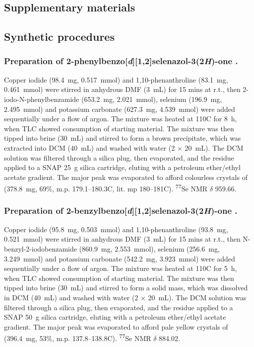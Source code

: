 \begin{refsection}
\section{Supplementary materials}

\subsection{Synthetic procedures}

\subsubsection[Preparation of \refcmpd{ebs}.]{Preparation of 2-phenylbenzo[\emph{d}][1,2]selenazol-3(2\emph{H})-one .}

Copper iodide (98.4~mg, 0.517~mmol) and 1,10-phenanthroline (83.1~mg, 0.461~mmol) were stirred in anhydrous DMF (3~mL) for 15 mins at r.t., then 2-iodo-N-phenylbenz\-amide (653.2~mg, 2.021~mmol), selenium (196.9~mg, 2.495~mmol) and potassium carbonate (627.3~mg, 4.539~mmol) were added sequentially under a flow of argon.
The mixture was heated at 110\degree C for 8~h, when TLC showed consumption of starting material.
The mixture was then tipped into brine (30~mL) and stirred to form a brown precipitate, which was extracted into DCM (40~mL) and washed with water (2 $\times$ 20~mL).
The DCM solution was filtered through a silica plug, then evaporated, and the residue applied to a SNAP 25~g silica cartridge, eluting with a petroleum ether/ethyl acetate gradient.
The major peak was evaporated to afford colourless crystals of  (378.8~mg, 69\%, m.p. 179.1--180.3\degree C, lit. mp 180--181\degree C). \textsuperscript{77}Se NMR $\delta$ 959.66.

\subsubsection[Preparation of \refcmpd{ebs.bn}.]{Preparation of 2-benzylbenzo[\emph{d}][1,2]selenazol-3(2\emph{H})-one .}

Copper iodide (95.8~mg, 0.503~mmol) and 1,10-phenanthroline (93.8~mg, 0.521~mmol) were stirred in anhydrous DMF (3~mL) for 15 mins at r.t., then N-benzyl-2-iodobenzamide (860.9~mg, 2.553~mmol), selenium (256.6~mg, 3.249~mmol) and potassium carbonate (542.2~mg, 3.923~mmol) were added sequentially under a flow of argon.
The mixture was heated at 110\degree C for 5~h, when TLC showed consumption of starting material.
The mixture was then tipped into brine (30~mL) and stirred to form a solid mass, which was dissolved in DCM (40~mL) and washed with water (2 $\times$ 20~mL).
The DCM solution was filtered through a silica plug, then evaporated, and the residue applied to a SNAP 50~g silica cartridge, eluting with a petroleum ether/ethyl acetate gradient.
The major peak was evaporated to afford pale yellow crystals of  (396.4~mg, 53\%, m.p. 137.8--138.8\degree C). \textsuperscript{77}Se NMR $\delta$ 884.02.


\end{refsection}
